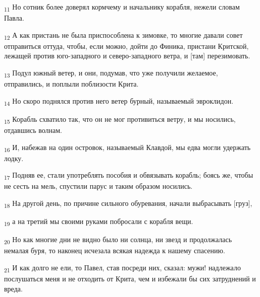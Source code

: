 \begin{tcolorbox}
\textsubscript{11} Но сотник более доверял кормчему и начальнику корабля, нежели словам Павла.
\end{tcolorbox}
\begin{tcolorbox}
\textsubscript{12} А как пристань не была приспособлена к зимовке, то многие давали совет отправиться оттуда, чтобы, если можно, дойти до Финика, пристани Критской, лежащей против юго-западного и северо-западного ветра, и [там] перезимовать.
\end{tcolorbox}
\begin{tcolorbox}
\textsubscript{13} Подул южный ветер, и они, подумав, что уже получили желаемое, отправились, и поплыли поблизости Крита.
\end{tcolorbox}
\begin{tcolorbox}
\textsubscript{14} Но скоро поднялся против него ветер бурный, называемый эвроклидон.
\end{tcolorbox}
\begin{tcolorbox}
\textsubscript{15} Корабль схватило так, что он не мог противиться ветру, и мы носились, отдавшись волнам.
\end{tcolorbox}
\begin{tcolorbox}
\textsubscript{16} И, набежав на один островок, называемый Клавдой, мы едва могли удержать лодку.
\end{tcolorbox}
\begin{tcolorbox}
\textsubscript{17} Подняв ее, стали употреблять пособия и обвязывать корабль; боясь же, чтобы не сесть на мель, спустили парус и таким образом носились.
\end{tcolorbox}
\begin{tcolorbox}
\textsubscript{18} На другой день, по причине сильного обуревания, начали выбрасывать [груз],
\end{tcolorbox}
\begin{tcolorbox}
\textsubscript{19} а на третий мы своими руками побросали с корабля вещи.
\end{tcolorbox}
\begin{tcolorbox}
\textsubscript{20} Но как многие дни не видно было ни солнца, ни звезд и продолжалась немалая буря, то наконец исчезала всякая надежда к нашему спасению.
\end{tcolorbox}
\begin{tcolorbox}
\textsubscript{21} И как долго не ели, то Павел, став посреди них, сказал: мужи! надлежало послушаться меня и не отходить от Крита, чем и избежали бы сих затруднений и вреда.
\end{tcolorbox}

